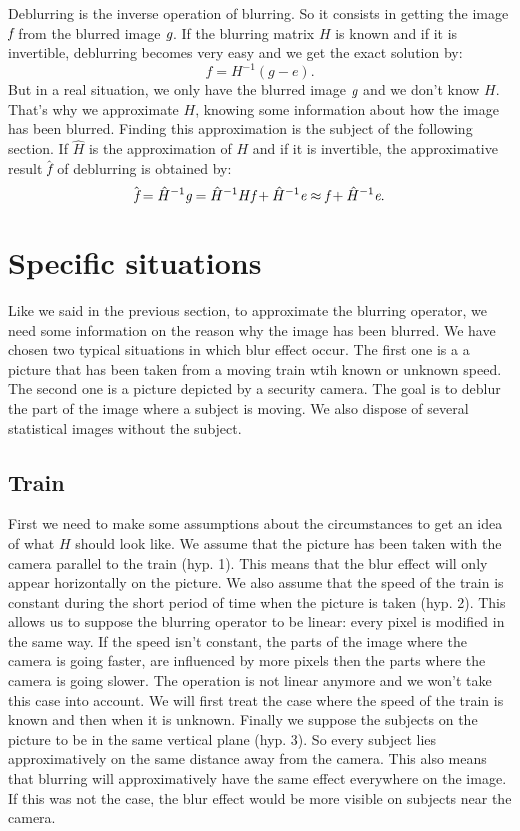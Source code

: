 Deblurring is the inverse operation of blurring. So it consists in getting the image $\emph{f}$ from the blurred image $\emph{g}$. If the blurring matrix $H$ is known and if it is invertible, deblurring becomes very easy and we get the exact solution by:
\begin{equation}
f=H^{-1}(g-e).
\end{equation}
But in a real situation, we only have the blurred image $\emph{g}$ and we don't know $H$. That's why we approximate $H$, knowing some information about how the image has been blurred. Finding this approximation is the subject of the following section. If $\hat{H}$ is the approximation of $H$ and if it is invertible, the approximative result $\hat{\emph{f}}$ of deblurring is obtained by:
\begin{equation}
\hat{\emph{f}} = \hat{H}^{-1} \emph{g} = \hat{H}^{-1}H\emph{f} + \hat{H}^{-1}\emph{e} \approx \emph{f} + \hat{H}^{-1}\emph{e}.
\end{equation}

\section{Specific situations}

Like we said in the previous section, to approximate the blurring operator, we need some information on the reason why the image has been blurred. We have chosen two typical situations in which blur effect occur. The first one is a a picture that has been taken from a moving train wtih known or unknown speed. The second one is a picture depicted by a security camera. The goal is to deblur the part of the image where a subject is moving. We also dispose of several statistical images without the subject.

\subsection{Train}

First we need to make some assumptions about the circumstances to get an idea of what $H$ should look like. We assume that the picture has been taken with the camera parallel to the train (hyp. 1). This means that the blur effect will only appear horizontally on the picture. We also assume that the speed of the train is constant during the short period of time when the picture is taken (hyp. 2). This allows us to suppose the blurring operator to be linear: every pixel is modified in the same way. If the speed isn't constant, the parts of the image where the camera is going faster, are influenced by more pixels then the parts where the camera is going slower. The operation is not linear anymore and we won't take this case into account. We will first treat the case where the speed of the train is known and then when it is unknown. Finally we suppose the subjects on the picture to be in the same vertical plane (hyp. 3). So every subject lies approximatively on the same distance away from the camera. This also means that blurring will approximatively have the same effect everywhere on the image. If this was not the case, the blur effect would be more visible on subjects near the camera.

